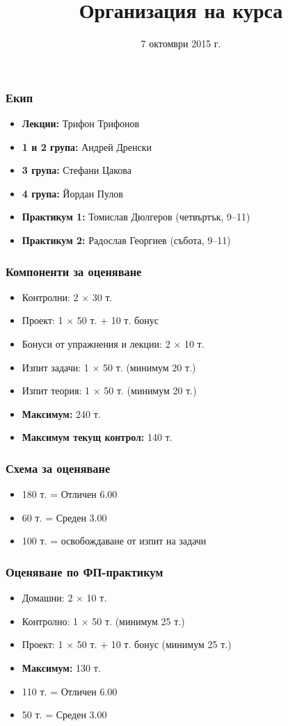 \documentclass{beamer}
\title{Организация на курса}
\date{7 октомври 2015 г.}
\begin{document}
\begin{frame}
  \titlepage
\end{frame}

\begin{frame}
  \frametitle{Екип}

  \begin{itemize}
  \item \textbf{Лекции:} Трифон Трифонов
  \item \textbf{1 и 2 група:} Андрей Дренски
  \item \textbf{3 група:} Стефани Цакова
  \item \textbf{4 група:} Йордан Пулов
  \item \textbf{Практикум 1:} Томислав Дюлгеров (четвъртък, 9--11)
  \item \textbf{Практикум 2:} Радослав Георгиев (събота, 9--11)
  \end{itemize}
\end{frame}

\begin{frame}
  \frametitle{Компоненти за оценяване}

  \begin{itemize}
  \item Контролни: 2 $\times$ 30 т.
  \item Проект: 1 $\times$ 50 т. + 10 т. бонус
  \item Бонуси от упражнения и лекции: 2 $\times$ 10 т.
  \item Изпит задачи: 1 $\times$ 50 т. (минимум 20 т.)
  \item Изпит теория: 1 $\times$ 50 т. (минимум 20 т.)
  \item \textbf{Максимум:} 240 т.
  \item \textbf{Максимум текущ контрол:} 140 т.
  \end{itemize}
\end{frame}

\begin{frame}
  \frametitle{Схема за оценяване}

  \begin{itemize}
  \item 180 т. = Отличен 6.00
  \item 60 т. = Среден 3.00
  \item 100 т. = освобождаване от изпит на задачи
  \end{itemize}
\end{frame}

\begin{frame}
  \frametitle{Оценяване по ФП-практикум}

  \begin{itemize}
  \item Домашни: 2 $\times$ 10 т.
  \item Контролно: 1 $\times$ 50 т. (минимум 25 т.)
  \item Проект: 1 $\times$ 50 т. + 10 т. бонус (минимум 25 т.)
  \item \textbf{Максимум:} 130 т.
  \item 110 т. = Отличен 6.00
  \item 50 т. = Среден 3.00
  \end{itemize}
\end{frame}
\end{document}

